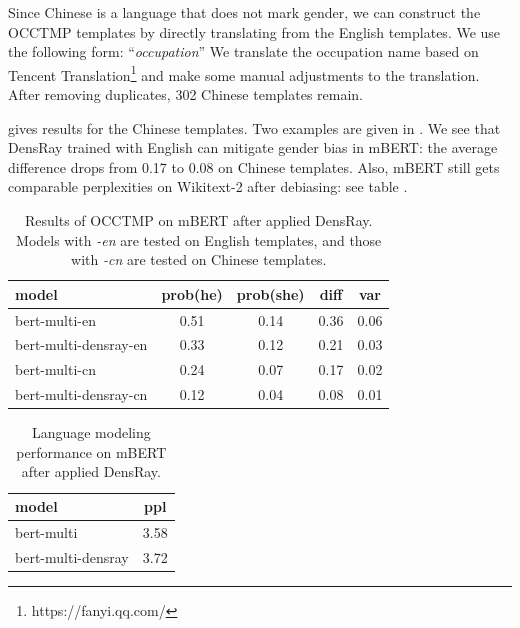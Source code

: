 Since Chinese is a language that does not mark gender, we
can construct the OCCTMP templates by directly translating
from the English templates. We use the following form:
``\text{[MASK]}\textit{occupation}''
We translate the occupation name based on
Tencent
Translation\footnote{https://fanyi.qq.com/} and make some
manual adjustments to the translation. After removing 
duplicates,  302 Chinese templates remain.

 gives
results for the Chinese templates.
Two examples are given in . We see that DensRay trained with English can mitigate gender bias in mBERT: the average difference drops from 0.17 to 0.08 on Chinese templates. Also, mBERT still gets comparable perplexities on Wikitext-2 after debiasing: see table . 
\begin{table}[ht]
	\centering
	\footnotesize
	\begin{tabular}{lcccc}
		\hline
		model & prob(he) & prob(she) & diff & var\\
		\hline
		\scriptsize bert-multi-en 
		& 0.51 & 0.14 & 0.36 & 0.06 \\
		\scriptsize 
		bert-multi-densray-en & 0.33 & 0.12 & 0.21 & 0.03 \\
		\scriptsize bert-multi-cn 
		& 0.24 & 0.07 & 0.17 & 0.02 \\
		\scriptsize bert-multi-densray-cn 
		& 0.12 & 0.04 & 0.08 & 0.01\\
		\hline
	\end{tabular}
	\caption{
		Results of OCCTMP on mBERT after applied DensRay. Models with \textit{-en} are tested on English templates, and those with \textit{-cn} are tested on Chinese templates.}
\end{table}
\begin{table}[ht]
	\centering
	\footnotesize
	\begin{tabular}{lc}
		\hline
		model & ppl\\
		\hline
		bert-multi & 3.58\\
		bert-multi-densray & 3.72\\
		\hline
	\end{tabular}
	\caption{
		Language modeling performance on mBERT after applied DensRay. }
\end{table}
